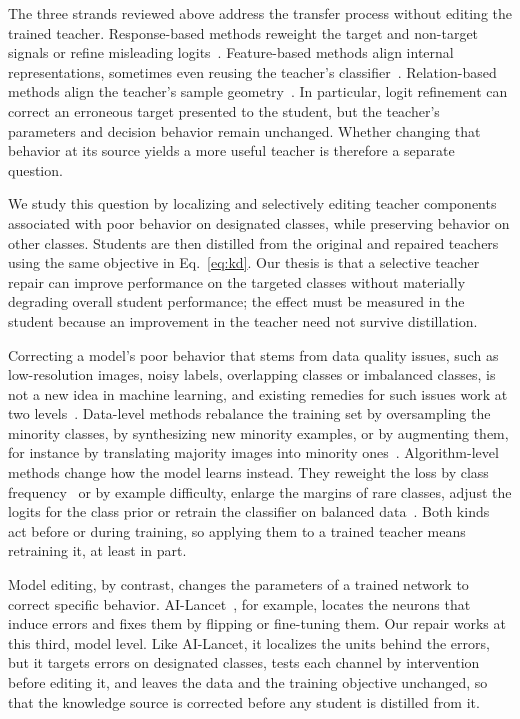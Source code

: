 \documentclass[10pt,journal,compsoc]{IEEEtran}
\theoremstyle{definition}
\begin{document}
The three strands reviewed above address the transfer process without editing
the trained teacher. Response-based methods reweight the target and non-target
signals or refine misleading logits~\cite{zhao2022decoupled,sun2025knowledge}.
Feature-based methods align internal representations, sometimes even reusing
the teacher's classifier~\cite{chen2022reused}. Relation-based methods align
the teacher's sample geometry~\cite{park2019relational}. In particular, logit
refinement can correct an erroneous target presented to the student, but the
teacher's parameters and decision behavior remain unchanged. Whether changing
that behavior at its source yields a more useful teacher is therefore a
separate question.

We study this question by localizing and selectively editing teacher
components associated with poor behavior on designated classes, while
preserving behavior on other classes. Students are then distilled from the
original and repaired teachers using the same objective in Eq.~\eqref{eq:kd}.
Our thesis is that a selective teacher repair can improve performance on the
targeted classes without materially degrading overall student performance;
the effect must be measured in the student because an improvement in the
teacher need not survive distillation.

Correcting a model's poor behavior that stems from data quality issues,
such as low-resolution images, noisy labels, overlapping classes or
imbalanced classes, is not a new idea
in machine learning, and existing remedies for such issues work at two
levels~\cite{zhang2023deep}. Data-level
methods rebalance the training set by oversampling the minority
classes, by synthesizing new minority examples,
or by augmenting them, for instance
by translating majority images into minority ones~\cite{zhang2023deep}.
Algorithm-level methods change how the model learns instead. They reweight
the loss by class frequency~\cite{cui2019class} or by example
difficulty, enlarge the margins of rare classes, adjust the logits for
the class prior or retrain the classifier on balanced
data~\cite{zhang2023deep}. Both kinds act before or during training,
so applying them to a trained teacher means retraining it, at least in
part.

Model editing, by contrast, changes the parameters of a trained
network to correct specific
behavior.
AI-Lancet~\cite{zhao2021ailancet}, for example, locates the neurons that
induce errors and fixes them by flipping or fine-tuning them. Our repair
works at this third, model level. Like AI-Lancet, it localizes the units
behind the errors, but it targets errors on designated classes, tests
each channel by intervention before editing it, and leaves the data and
the training objective unchanged, so that the knowledge source is
corrected before any student is distilled from it.
\end{document}
